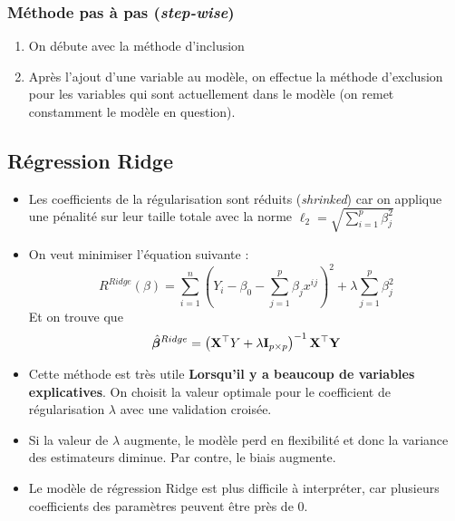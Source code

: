 \documentclass[10pt, french]{article}
\begin{document}
\begin{multicols*}{3}
\subsubsection*{Méthode pas à pas (\textit{step-wise})}
\begin{enumerate}
\item On débute avec la méthode d'inclusion
\item Après l'ajout d'une variable au modèle, on effectue la méthode d'exclusion pour les variables qui sont actuellement dans le modèle (on remet constamment le modèle en question).
\end{enumerate}
%

\subsection*{Régression Ridge}
\begin{itemize}
\item Les coefficients de la régularisation sont réduits (\emph{shrinked}) car on applique une pénalité sur leur taille totale avec la norme $\ell_2 = \sqrt{\sum_{i=1}^{p} \beta_j^2}$
\item On veut minimiser l'équation suivante : 
\[R^{Ridge}(\beta) = \sum_{i=1}^{n} \left( Y_i - \beta_0 - \sum_{j=1}^{p} \beta_j x^{ij} \right)^2 + \lambda \sum_{j=1}^{p} \beta_j^2  \]
Et on trouve que
\[\hat{\bm{\beta}}^{Ridge} = \left( \mathbf{X}^\top Y + \lambda \mathbf{I}_{p \times p} \right)^{-1}  \mathbf{X}^\top \mathbf{Y}  \]
\item Cette méthode est très utile \textbf{Lorsqu'il y a beaucoup de variables explicatives}. On choisit la valeur optimale pour le coefficient de régularisation $\lambda$ avec une validation croisée.
\item Si la valeur de $\lambda$ augmente, le modèle perd en flexibilité et donc la variance des estimateurs diminue. Par contre, le biais augmente.
\item Le modèle de régression Ridge est plus difficile à interpréter, car plusieurs coefficients des paramètres peuvent être près de 0.
\end{itemize}


\end{multicols*}
\end{document}
